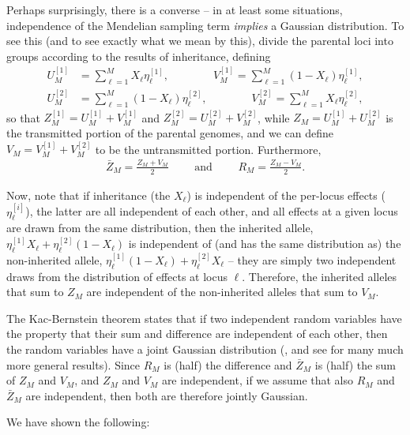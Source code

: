 \documentclass{article}
\newcommand{\1}{\mathbbm{1}}
\theoremstyle{remark}
\theoremstyle{definition}
\begin{document}
Perhaps surprisingly, there is a converse --
in at least some situations,
independence of the Mendelian sampling term \emph{implies} a Gaussian distribution.
To see this (and to see exactly what we mean by this),
divide the parental loci into groups according to the results of inheritance,
defining
\begin{align*}
    U_M^{[1]} &= \sum_{\ell=1}^M X_\ell \eta_\ell^{[1]}  ,
    \qquad \qquad
    V_M^{[1]} = \sum_{\ell=1}^M (1-X_\ell) \eta_\ell^{[1]} ,  \\
    U_M^{[2]} &= \sum_{\ell=1}^M (1-X_\ell) \eta_\ell^{[2]} ,
    \qquad \qquad
    V_M^{[2]} = \sum_{\ell=1}^M X_\ell \eta_\ell^{[2]}  ,
\end{align*}
so that 
$Z_M^{[1]} = U_M^{[1]} + V_M^{[1]}$ and
$Z_M^{[2]} = U_M^{[2]} + V_M^{[2]}$, while
$Z_M = U_M^{[1]} + U_M^{[2]}$ is the transmitted portion of the parental genomes,
and we can define $V_M = V_M^{[1]} + V_M^{[2]}$ to be the untransmitted portion.
Furthermore,
\begin{align*}
    \bar Z_M = \frac{Z_M + V_M}{2}
    \qquad \text{ and } \qquad
    R_M = \frac{Z_M - V_M}{ 2 } .
\end{align*}

Now, note that if inheritance (the $X_\ell$) is independent of the per-locus effects ($\eta_\ell^{[i]}$),
the latter are all independent of each other,
and all effects at a given locus are drawn from the same distribution,
then the inherited allele, 
$\eta_\ell^{[1]} X_\ell + \eta_\ell^{[2]} (1-X_\ell)$
is independent of (and has the same distribution as)
the non-inherited allele,
$\eta_\ell^{[1]} (1-X_\ell) + \eta_\ell^{[2]} X_\ell$
-- they are simply two independent draws from the distribution of effects at locus $\ell$.
Therefore, the inherited alleles that sum to $Z_M$
are independent of the non-inherited alleles that sum to $V_M$.

The Kac-Bernstein theorem states that if two independent random variables
have the property that their sum and difference are independent of each other,
then the random variables have a joint Gaussian distribution
(\citet{kac1939characterization,bernstein1941property},
and see \citep{kagan1973characterization} for many much more general results).
Since $R_M$ is (half) the difference and $\bar Z_M$ is (half) the sum
of $Z_M$ and $V_M$, and $Z_M$ and $V_M$ are independent,
if we assume that also $R_M$ and $\bar Z_M$ are independent,
then both are therefore jointly Gaussian.

We have shown the following:
\end{document}
